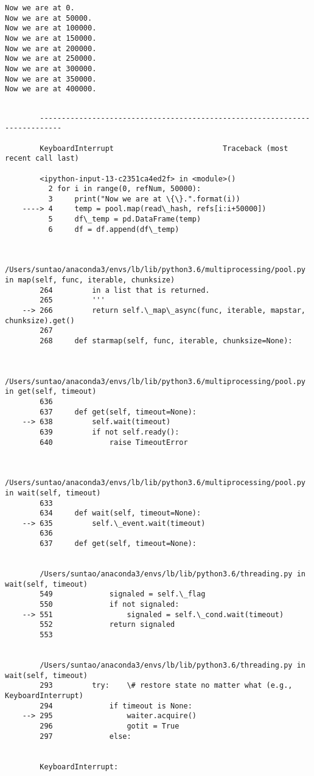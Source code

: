 \documentclass[11pt]{article}
\begin{document}
    \begin{Verbatim}[commandchars=\\\{\}]
Now we are at 0.
Now we are at 50000.
Now we are at 100000.
Now we are at 150000.
Now we are at 200000.
Now we are at 250000.
Now we are at 300000.
Now we are at 350000.
Now we are at 400000.

    \end{Verbatim}

    \begin{Verbatim}[commandchars=\\\{\}]

        ---------------------------------------------------------------------------

        KeyboardInterrupt                         Traceback (most recent call last)

        <ipython-input-13-c2351ca4ed2f> in <module>()
          2 for i in range(0, refNum, 50000):
          3     print("Now we are at \{\}.".format(i))
    ----> 4     temp = pool.map(read\_hash, refs[i:i+50000])
          5     df\_temp = pd.DataFrame(temp)
          6     df = df.append(df\_temp)


        /Users/suntao/anaconda3/envs/lb/lib/python3.6/multiprocessing/pool.py in map(self, func, iterable, chunksize)
        264         in a list that is returned.
        265         '''
    --> 266         return self.\_map\_async(func, iterable, mapstar, chunksize).get()
        267 
        268     def starmap(self, func, iterable, chunksize=None):


        /Users/suntao/anaconda3/envs/lb/lib/python3.6/multiprocessing/pool.py in get(self, timeout)
        636 
        637     def get(self, timeout=None):
    --> 638         self.wait(timeout)
        639         if not self.ready():
        640             raise TimeoutError


        /Users/suntao/anaconda3/envs/lb/lib/python3.6/multiprocessing/pool.py in wait(self, timeout)
        633 
        634     def wait(self, timeout=None):
    --> 635         self.\_event.wait(timeout)
        636 
        637     def get(self, timeout=None):


        /Users/suntao/anaconda3/envs/lb/lib/python3.6/threading.py in wait(self, timeout)
        549             signaled = self.\_flag
        550             if not signaled:
    --> 551                 signaled = self.\_cond.wait(timeout)
        552             return signaled
        553 


        /Users/suntao/anaconda3/envs/lb/lib/python3.6/threading.py in wait(self, timeout)
        293         try:    \# restore state no matter what (e.g., KeyboardInterrupt)
        294             if timeout is None:
    --> 295                 waiter.acquire()
        296                 gotit = True
        297             else:


        KeyboardInterrupt: 

    \end{Verbatim}
\end{document}

